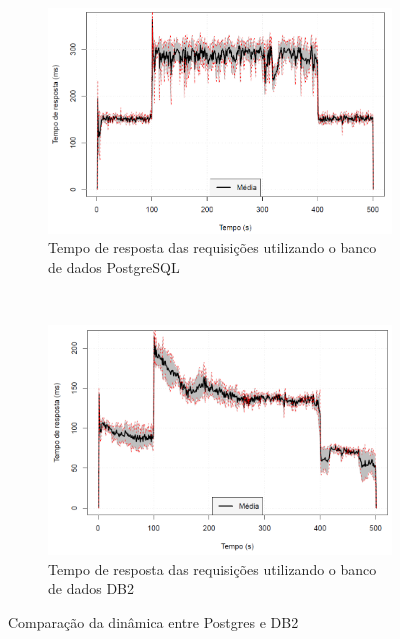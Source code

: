 \begin{figure}[!htb]
	\centering
	\begin{subfigure}[b]{0.7\textwidth}
		\includegraphics[width=\textwidth]{../../apresentation/images/tempo-resposta-postgres-crop.png}
		\caption{Tempo de resposta das requisições utilizando o banco de dados PostgreSQL}
		\label{fig:edwin-postgres}
	\end{subfigure}
	~
	\begin{subfigure}[b]{0.7\textwidth}
		\includegraphics[width=\textwidth]{../../apresentation/images/tempo-resposta-db2-crop.png}
		\caption{Tempo de resposta das requisições utilizando o banco de dados DB2}
		\label{fig:edwin-db2}
	\end{subfigure}
	\caption{Comparação da dinâmica entre Postgres e DB2}
	\label{fig:edwin-comparacao-bd}
\end{figure}

